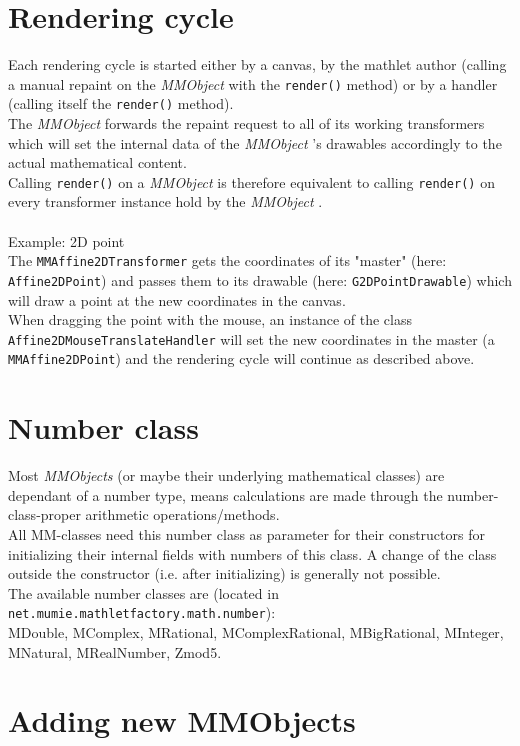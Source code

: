 \documentclass[a4paper,12pt]{book}
\newcommand{\mmo}{\emph{MMObject }}
\newcommand{\mmos}{\emph{MMObjects }}
\begin{document}
  
\section{Rendering cycle}
  Each rendering cycle is started either by a canvas, by the mathlet author (calling a manual repaint on the \mmo with 
  the \verb|render()| method) or by a handler (calling itself the \verb|render()| method).\\
  The \mmo forwards the repaint request to all of its working transformers which will set the internal data
  of the \mmo's drawables accordingly to the actual mathematical content.\\
  Calling \verb|render()| on a \mmo is therefore equivalent to calling \verb|render()| on every transformer
  instance hold by the \mmo.\\
  \\
  Example: 2D point\\
  The \verb|MMAffine2DTransformer| gets the coordinates of its "master" (here: \verb|Affine2DPoint|) and passes 
  them to its drawable (here: \verb|G2DPointDrawable|) which will draw a point at the new coordinates in the canvas.\\
  When dragging the point with the mouse, an instance of the class \verb|Affine2D|\-\verb|MouseTranslateHandler| will set 
  the new coordinates in the master (a \verb|MMAffine2DPoint|) and the rendering cycle will continue
  as described above.
  
  
\section{Number class}
  Most \mmos (or maybe their underlying mathematical classes) are dependant of a number type,
  means calculations are made through the number-class-proper arithmetic operations/methods.\\
  All MM-classes need this number class as parameter for their constructors for initializing their
  internal fields with numbers of this class. A change of the class outside the constructor (i.e. after
  initializing) is generally not possible.\\
  The available number classes are (located in \verb|net.mumie.mathletfactory.math.number|):\\
  {\ttfamily
    MDouble, MComplex, MRational, MComplexRational, MBigRational, MInteger, MNatural, MRealNumber, Zmod5.\\
  }
  
\section{Adding new MMObjects}
  
\end{document}
